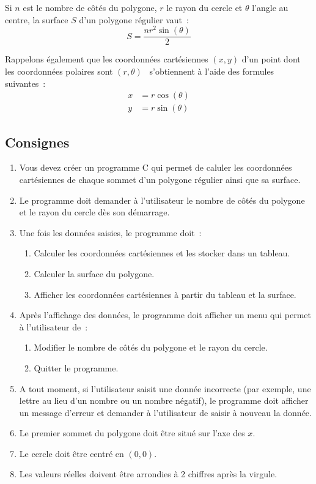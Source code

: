 \documentclass[12pt,addpoints,french,a4paper,oneside]{exam}
\begin{document}
Si \(n\) est le nombre de côtés du polygone, \(r\) le rayon du cercle et \(\theta{}\) l'angle au centre, la surface \(S\) d'un polygone régulier vaut~:
\begin{equation*}
	S = \frac{n r^2 \sin\left(\theta{}\right)}{2}
\end{equation*}

Rappelons également que les coordonnées cartésiennes \(\left(x, y\right)\) d'un point dont les coordonnées polaires sont \(\left(r, \theta{}\right)\)~ s'obtiennent à l'aide des formules suivantes~:
\begin{align*}
	x & = r \cos\left(\theta{}\right) \\
	y & = r \sin\left(\theta{}\right)
\end{align*}

\subsection*{Consignes}

\begin{enumerate}
	\item Vous devez créer un programme C qui permet de caluler les coordonnées cartésiennes de chaque sommet d'un polygone régulier ainsi que sa surface.
	\item Le programme doit demander à l'utilisateur le nombre de côtés du polygone et le rayon du cercle dès son démarrage.
	\item Une fois les données saisies, le programme doit~:
	      \begin{enumerate}
		      \item Calculer les coordonnées cartésiennes et les stocker dans un tableau.
		      \item Calculer la surface du polygone.
		      \item Afficher les coordonnées cartésiennes à partir du tableau et la surface.
	      \end{enumerate}
	\item Après l'affichage des données, le programme doit afficher un menu qui permet à l'utilisateur de~:
	      \begin{enumerate}
		      \item Modifier le nombre de côtés du polygone et le rayon du cercle.
		      \item Quitter le programme.
	      \end{enumerate}
	\item A tout moment, si l'utilisateur saisit une donnée incorrecte (par exemple, une lettre au lieu d'un nombre ou un nombre négatif), le programme doit afficher un message d'erreur et demander à l'utilisateur de saisir à nouveau la donnée.
	\item Le premier sommet du polygone doit être situé sur l'axe des \(x\).
	\item Le cercle doit être centré en \(\left(0, 0\right)\).
	\item Les valeurs réelles doivent être arrondies à 2 chiffres après la virgule.
\end{enumerate}
\end{document}

